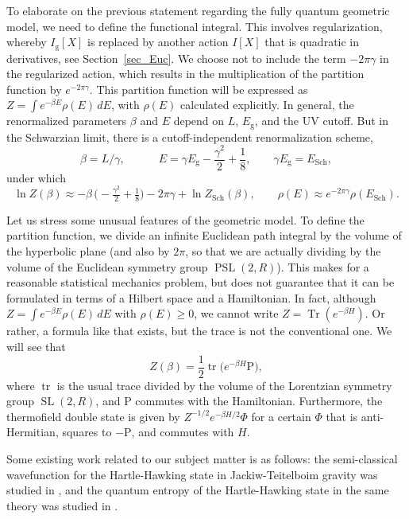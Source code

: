 \documentclass[12pt]{article}
\newcommand{\lt}{\left}
\newcommand{\rt}{\right}
\newcommand{\RR}{\mathbb{R}}
\DeclareMathOperator{\tr}{tr}
\DeclareMathOperator{\Tr}{Tr}
\DeclareMathOperator{\PSL}{PSL}
\DeclareMathOperator{\tSL}{\widetilde{\mathrm{SL}}}
\DeclareMathOperator{\Sch}{Sch}
\newcommand{\g}{\text{g}}
\newcommand{\Rho}{\mathrm{P}}
\def\widetilde#1{#1}%
\def\RR{R}
\begin{document}
To elaborate on the previous statement regarding the fully quantum geometric model, we need to define the functional integral. This involves regularization, whereby $I_{\g}[X]$ is replaced by another action $I[X]$ that is quadratic in derivatives, see Section~\ref{sec_Euc}. We choose not to include the term $-2\pi\gamma$ in the regularized action, which results in the multiplication of the partition function by $e^{-2\pi\gamma}$. This partition function will be expressed as $Z=\int e^{-\beta E}\rho(E)\,dE$, with $\rho(E)$ calculated explicitly. In general, the renormalized parameters $\beta$ and $E$ depend on $L$, $E_{\g}$, and the UV cutoff. But in the Schwarzian limit, there is a cutoff-independent renormalization scheme,
\begin{equation}
\beta=L/\gamma,\qquad\quad
E=\gamma E_{\g}-\frac{\gamma^2}{2}+\frac{1}{8},\qquad \gamma E_{\g}=E_{\Sch},
\end{equation}
under which
\begin{equation}
\ln Z(\beta)\approx -\beta\,\bigl(-\tfrac{\gamma^2}{2}+\tfrac{1}{8}\bigr)
-2\pi\gamma + \ln Z_{\Sch}(\beta),\qquad
\rho(E)\approx e^{-2\pi\gamma}\rho(E_{\Sch}).
\end{equation}

Let us stress some unusual features of the geometric model. To define the partition function, we divide an infinite Euclidean path integral by the volume of the hyperbolic plane (and also by $2\pi$, so that we are actually dividing by the volume of the Euclidean symmetry group $\PSL(2,\RR)$). This makes for a reasonable statistical mechanics problem, but does not guarantee that it can be formulated in terms of a Hilbert space and a Hamiltonian. In fact, although $Z=\int e^{-\beta E}\rho(E)\,dE$ with $\rho(E)\geq 0$, we cannot write $Z=\Tr\lt(e^{-\beta H}\rt)$. Or rather, a formula like that exists, but the trace is not the conventional one. We will see that
\begin{equation}
Z(\beta)=\frac{1}{2}\tr\bigl(e^{-\beta H}\Rho\bigr),
\end{equation}
where $\tr$ is the usual trace divided by the volume of the Lorentzian symmetry group $\tSL(2,\RR)$, and $\Rho$ commutes with the Hamiltonian. Furthermore, the thermofield double state is given by $Z^{-1/2}e^{-\beta H/2}\Phi$ for a certain $\Phi$ that is anti-Hermitian, squares to $-\Rho$, and commutes with $H$.

Some existing work related to our subject matter is as follows: the semi-classical wavefunction for the Hartle-Hawking state in Jackiw-Teitelboim gravity was studied in \cite{HaJa18}, and the quantum entropy of the Hartle-Hawking state in the same theory was studied in \cite{Lin18}.
\end{document}
